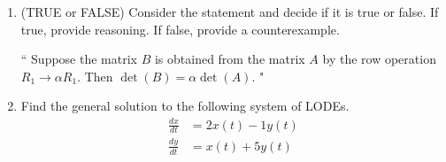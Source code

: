 \documentclass[14pt]{article}
\begin{document}
\begin{enumerate}

\item (TRUE or FALSE) Consider the statement and decide if it is true or false.  If true, provide reasoning.  If false, provide a counterexample.
\begin{center}
`` Suppose the matrix $ B $ is obtained from the matrix $ A $ by the row operation $ R_1 \rightarrow \alpha R_1 $.  Then $ \det(B) = \alpha\det(A) $.  "
\end{center}

\item Find the general solution to the following system of LODEs.
\begin{align*}
\frac{dx}{dt} &= 2x(t) - 1y(t) \\
\frac{dy}{dt} &= x(t) + 5y(t)
\end{align*}




























\end{enumerate}
\end{document}
